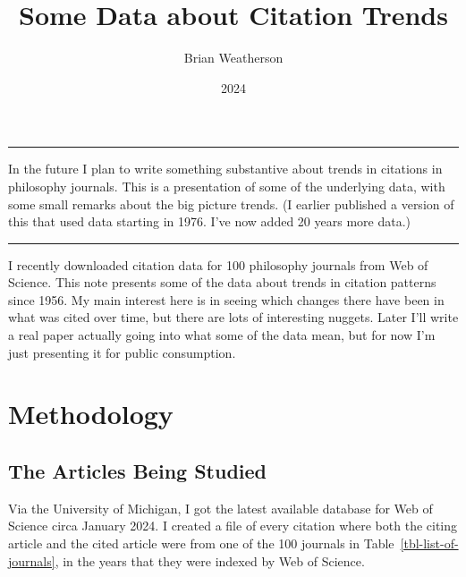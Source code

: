 \documentclass[
  10pt,
  letterpaper,
  DIV=11,
  numbers=noendperiod,
  twoside]{scrartcl}
\title{Some Data about Citation Trends}
\author{Brian Weatherson}
\date{2024}
\renewenvironment{abstract}
 {\vspace{-1.25cm}
 \quotation\small\noindent\rule{\linewidth}{.5pt}\par\smallskip
 \noindent }
 {\par\noindent\rule{\linewidth}{.5pt}\endquotation}
\begin{document}
\maketitle
\begin{abstract}
In the future I plan to write something substantive about trends in
citations in philosophy journals. This is a presentation of some of the
underlying data, with some small remarks about the big picture trends.
(I earlier published a version of this that used data starting in 1976.
I've now added 20 years more data.)
\end{abstract}


I recently downloaded citation data for 100 philosophy journals from Web
of Science. This note presents some of the data about trends in citation
patterns since 1956. My main interest here is in seeing which changes
there have been in what was cited over time, but there are lots of
interesting nuggets. Later I'll write a real paper actually going into
what some of the data mean, but for now I'm just presenting it for
public consumption.

\section{Methodology}\label{sec-methodology}

\subsection{The Articles Being Studied}\label{sec-articles-studied}

Via the University of Michigan, I got the latest available database for
Web of Science circa January 2024. I created a file of every citation
where both the citing article and the cited article were from one of the
100 journals in Table~\ref{tbl-list-of-journals}, in the years that they
were indexed by Web of Science.
\end{document}
